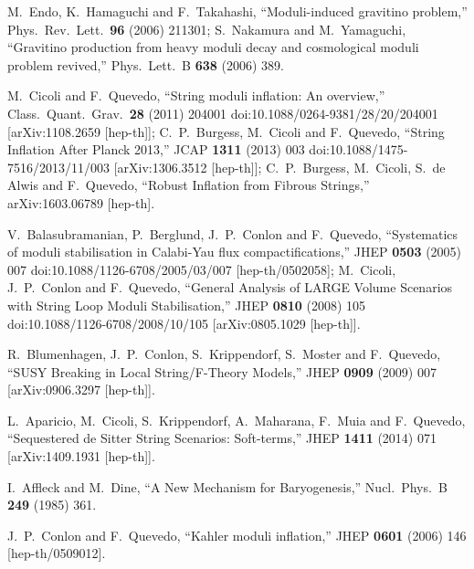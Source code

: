 \documentclass[11pt,a4paper]{article}
\begin{document}
\begin{thebibliography}{99}
M.~Endo, K.~Hamaguchi and F.~Takahashi,
  ``Moduli-induced gravitino problem,''
  Phys.\ Rev.\ Lett.\  {\bf 96} (2006) 211301;
S.~Nakamura and M.~Yamaguchi,
  ``Gravitino production from heavy moduli decay and cosmological moduli problem revived,''
  Phys.\ Lett.\ B {\bf 638} (2006) 389.

M.~Cicoli and F.~Quevedo,
  ``String moduli inflation: An overview,''
  Class.\ Quant.\ Grav.\  {\bf 28} (2011) 204001
  doi:10.1088/0264-9381/28/20/204001
  [arXiv:1108.2659 [hep-th]];
	C.~P.~Burgess, M.~Cicoli and F.~Quevedo,
  ``String Inflation After Planck 2013,''
  JCAP {\bf 1311} (2013) 003
  doi:10.1088/1475-7516/2013/11/003
  [arXiv:1306.3512 [hep-th]];
  C.~P.~Burgess, M.~Cicoli, S.~de Alwis and F.~Quevedo,
  ``Robust Inflation from Fibrous Strings,''
  arXiv:1603.06789 [hep-th].

   V.~Balasubramanian, P.~Berglund, J.~P.~Conlon and F.~Quevedo,
  ``Systematics of moduli stabilisation in Calabi-Yau flux compactifications,''
  JHEP {\bf 0503} (2005) 007
  doi:10.1088/1126-6708/2005/03/007
  [hep-th/0502058];
M.~Cicoli, J.~P.~Conlon and F.~Quevedo,
  ``General Analysis of LARGE Volume Scenarios with String Loop Moduli Stabilisation,''
  JHEP {\bf 0810} (2008) 105
  doi:10.1088/1126-6708/2008/10/105
  [arXiv:0805.1029 [hep-th]].

  R.~Blumenhagen, J.~P.~Conlon, S.~Krippendorf, S.~Moster and F.~Quevedo,
  ``SUSY Breaking in Local String/F-Theory Models,''
  JHEP {\bf 0909} (2009) 007
  [arXiv:0906.3297 [hep-th]].

  L.~Aparicio, M.~Cicoli, S.~Krippendorf, A.~Maharana, F.~Muia and F.~Quevedo,
  ``Sequestered de Sitter String Scenarios: Soft-terms,''
  JHEP {\bf 1411} (2014) 071
  [arXiv:1409.1931 [hep-th]].

  I.~Affleck and M.~Dine,
  ``A New Mechanism for Baryogenesis,''
  Nucl.\ Phys.\ B {\bf 249} (1985) 361.

  J.~P.~Conlon and F.~Quevedo,
  ``Kahler moduli inflation,''
  JHEP {\bf 0601} (2006) 146
  [hep-th/0509012].
 

\end{thebibliography}
\end{document}
